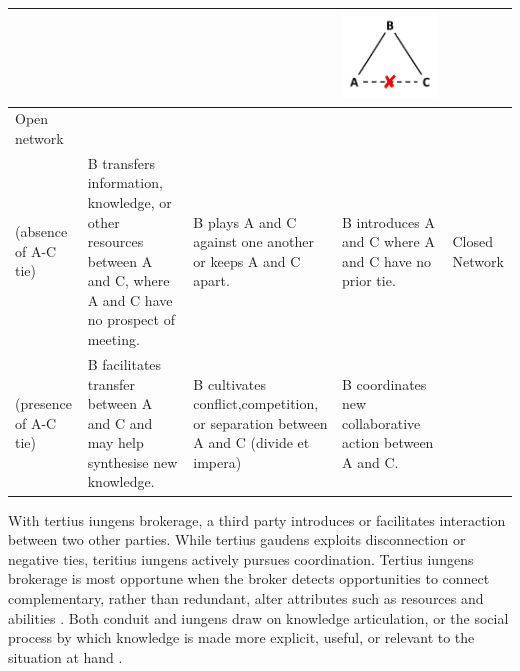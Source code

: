 \begin{table}[]
\begin{tabularx}{\textwidth}{>{\raggedright}p{3.5cm}>{\raggedright}p{3.5cm}>{\raggedright}p{3.5cm}>{\raggedright}p{3.5cm}}
	&  &  & \begin{minipage}{.2\textwidth} \centering \includegraphics[width=0.7\linewidth]{Images/TG_brokerage_2} \end{minipage}  &  \\
	\midrule
	Open network\\(absence of A-C tie) & B transfers information, knowledge, or other resources between A and C, where A and C have no prospect of meeting. & B plays A and C against one another or keeps A and C apart. & B introduces A and C where A and C have no prior tie. &
	\midrule
	Closed Network\\(presence of A-C tie) & B facilitates transfer between A and C and may help synthesise new knowledge. & B cultivates conflict,competition, or separation between A and C (divide et impera) & B coordinates new collaborative action between A and C. & \\ 
	\bottomrule
\end{tabularx}
\end{table}

With tertius iungens brokerage, a third party introduces or facilitates interaction between two other parties. While tertius gaudens exploits disconnection or negative ties, teritius iungens actively pursues coordination. Tertius iungens brokerage is most opportune when the broker detects opportunities to connect complementary, rather than redundant, alter attributes such as resources and abilities \citep{obstfeld2014brokerage}. Both conduit and iungens draw on knowledge articulation, or the social process by which knowledge is made more explicit, useful, or relevant to the situation at hand \citep{obstfeld2005social,obstfeld2011saying,obstfeld2012creative}.

